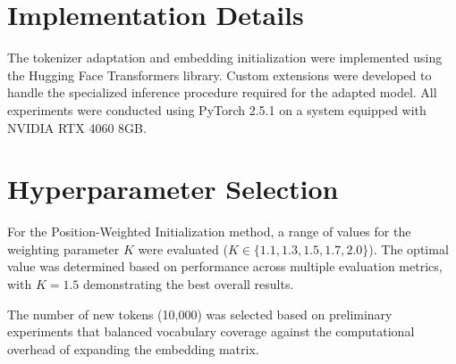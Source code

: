 \section{Implementation Details}
The tokenizer adaptation and embedding initialization were implemented using the Hugging Face Transformers library. Custom extensions were developed to handle the specialized inference procedure required for the adapted model. All experiments were conducted using PyTorch 2.5.1 on a system equipped with NVIDIA RTX 4060 8GB.

\section{Hyperparameter Selection}
For the Position-Weighted Initialization method, a range of values for the weighting parameter $K$ were evaluated ($K \in \{1.1, 1.3, 1.5, 1.7, 2.0\}$). The optimal value was determined based on performance across multiple evaluation metrics, with $K = 1.5$ demonstrating the best overall results.

The number of new tokens (10,000) was selected based on preliminary experiments that balanced vocabulary coverage against the computational overhead of expanding the embedding matrix.
